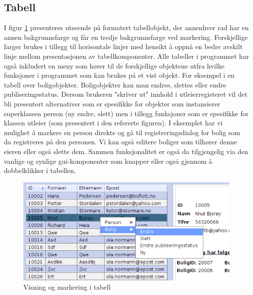 \subsection{Tabell}
I figur \ref{fig:tabell} presenteres utseende på formatert tabellobjekt, der annenhver rad har en annen bakgrunnsfarge og får en tredje bakgrunnsfarge ved markering. Forskjellige farger brukes i tillegg til horisontale linjer med hensikt å oppnå en bedre avskilt linje mellom presentasjonen av tabellkomponenter. Alle tabeller i programmet har også inkludert en meny som hører til de forskjellige objektene utfra hvilke funksjoner i programmet som kan brukes på et vist objekt. For eksempel i en tabell over boligobjekter. Boligobjekter kan man endres, slettes eller endre publiseringsstatus. Dersom brukeren "skriver ut" innhold i utleierregisteret vil det bli presentert alternativer som er spesifikke for objekter som instansierer superklassen person (ny endre, slett) men i tillegg funksjoner som er spesifikke for klassen utleier (som presentert i den refererte figuren). I eksemplet har vi mulighet å markere en person direkte og gå til registreringsdialog for bolig som da registreres på den personen. Vi kan også editere boliger som tilhører denne eieren eller også slette dem. Sammen funksjonalitet er også da tilgjengelig via den vanlige og synlige gui-komponenter som knapper eller også gjennom å dobbelklikker i tabellen.

\begin{figure}[ht!]
\center
 \includegraphics[scale=0.7]{./img/produktdokumentasjon/visuelle_detaljer/tabell.png}
 \caption{Visning og markering i tabell}
 \label{fig:tabell}
\end{figure}

